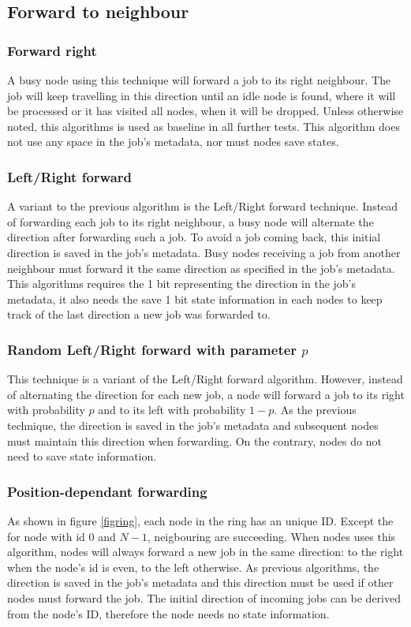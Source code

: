\documentclass[10pt,a4paper]{article}
\begin{document}
\subsection{Forward to neighbour}
\subsubsection*{Forward right}
A busy node using this technique will forward a job to its right neighbour. The job will keep travelling in this direction until an idle node is found, where it will be processed or it has visited all nodes, when it will be dropped. Unless otherwise noted, this algorithms is used as baseline in all further tests. This algorithm does not use any space in the job's metadata, nor must nodes save states.

\subsubsection*{Left/Right forward}
A variant to the previous algorithm is the Left/Right forward technique. Instead of forwarding each job to its right neighbour, a busy node will alternate the direction after forwarding such a job. To avoid a job coming back, this initial direction is saved in the job's metadata. Busy nodes receiving a job from another neighbour must forward it the same direction as specified in the job's metadata. This algorithms requires the 1 bit representing the direction in the job's metadata, it also needs the save 1 bit state information in each nodes to keep track of the last direction a new job was forwarded to.

\subsubsection*{Random Left/Right forward with parameter $p$}
This technique is a variant of the Left/Right forward algorithm. However, instead of alternating the direction for each new job, a node will forward a job to its right with probability $p$ and to its left with probability $1-p$. As the previous technique, the direction is saved in the job's metadata and subsequent nodes must maintain this direction when forwarding. On the contrary, nodes do not need to save state information.

\subsubsection*{Position-dependant forwarding}
As shown in figure \ref{figring}, each node in the ring has an unique ID. Except the for node with id $0$ and $N-1$, neigbouring are succeeding. When nodes uses this algorithm, nodes will always forward a new job in the same direction: to the right when the node's id is even, to the left otherwise. As previous algorithms, the direction is saved in the job's metadata and this direction must be used if other nodes must forward the job. The initial direction of incoming jobs can be derived from the node's ID, therefore the node needs no state information.
\end{document}
